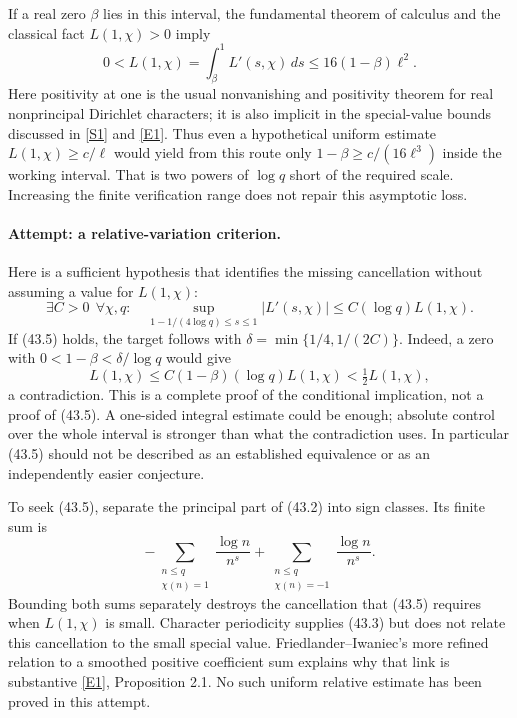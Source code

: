 \documentclass[11pt,a4paper]{article}
\newcommand{\sref}[2]{\hyperlink{source:#1:#2}{[S#2]}}
\newcommand{\eref}[2]{\hyperlink{extra:#1:#2}{[E#2]}}
\numberwithin{equation}{section}
\begin{document}
If a real zero $\beta$ lies in this interval, the fundamental theorem of
calculus and the classical fact $L(1,\chi)>0$ imply
\[
 0<L(1,\chi)=\int_\beta^1 L'(s,\chi)\,ds
       \le16(1-\beta)\ell^2. \tag{43.4}
\]
Here positivity at one is the usual nonvanishing and positivity theorem
for real nonprincipal Dirichlet characters; it is also implicit in the
special-value bounds discussed in \sref{statement}{1} and \eref{statement}{1}.
Thus even a hypothetical uniform estimate
$L(1,\chi)\ge c/\ell$ would yield from this route only
$1-\beta\ge c/(16\ell^3)$ inside the working interval. That is two powers
of $\log q$ short of the required scale. Increasing the finite verification
range does not repair this asymptotic loss.

\paragraph{Attempt: a relative-variation criterion.}
Here is a sufficient hypothesis that identifies the missing cancellation
without assuming a value for $L(1,\chi)$:
\[
 \exists C>0\ \ \forall\chi,q:\quad
 \sup_{1-1/(4\log q)\le s\le1}|L'(s,\chi)|
          \le C(\log q)L(1,\chi). \tag{43.5}
\]
If (43.5) holds, the target follows with
$\delta=\min\{1/4,1/(2C)\}$. Indeed, a zero with
$0<1-\beta<\delta/\log q$ would give
\[
 L(1,\chi)\le C(1-\beta)(\log q)L(1,\chi)
                  <\tfrac12 L(1,\chi),
\]
a contradiction. This is a complete proof of the conditional implication,
not a proof of (43.5). A one-sided integral estimate could be enough;
absolute control over the whole interval is stronger than what the
contradiction uses. In particular (43.5) should not be described as an
established equivalence or as an independently easier conjecture.

To seek (43.5), separate the principal part of (43.2) into sign classes.
Its finite sum is
\[
 -\sum_{\substack{n\le q\\\chi(n)=1}}\frac{\log n}{n^s}
 +\sum_{\substack{n\le q\\\chi(n)=-1}}\frac{\log n}{n^s}.
\]
Bounding both sums separately destroys the cancellation that (43.5)
requires when $L(1,\chi)$ is small. Character periodicity supplies (43.3)
but does not relate this cancellation to the small special value.
Friedlander--Iwaniec's more refined relation to a smoothed positive
coefficient sum explains why that link is substantive
\eref{statement}{1}, Proposition 2.1. No such uniform relative estimate has been
proved in this attempt.
\end{document}
